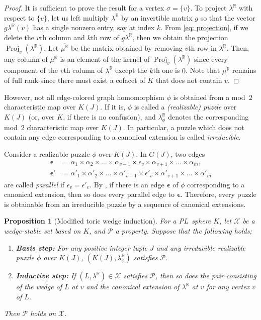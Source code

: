 \documentclass[11pt]{amsart}
\theoremstyle{plain}
\newtheorem{proposition}[theorem]{Proposition}
\numberwithin{equation}{section}
\theoremstyle{definition}
\newcommand{\R}{\mathbb{R}}
\newcommand{\cP}{\mathcal{P}}
\newcommand{\cX}{\mathcal{X}}
\DeclareMathOperator{\proj}{Proj}
\begin{document}
\begin{proof}
    It is sufficient to prove the result for a vertex $\sigma = \{v\}$.
    To project $\lambda^\R$ with respect to $\{v\}$, let us left multiply $\lambda^\R$ by an invertible matrix $g$ so that the vector $g\lambda^\R(v)$ has a single nonzero entry, say at index $k$.
    From \eqref{eq: projection}, if we delete the $v$th column and $k$th row of $g\lambda^\R$, then we obtain the projection $\proj_{v}(\lambda^\R)$.
    Let $\overline{\mu^\R}$ be the matrix obtained by removing $v$th row in $\overline{\lambda^\R}$.
    Then, any column of $\overline{\mu^\R}$ is an element of the kernel of $\proj_{v}(\lambda^\R)$ since every component of the $v$th column of $\lambda^\R$ except the $k$th one is $0$.
    Note that $\overline{\mu^\R}$ remains of full rank since there must exist a cofacet of $K$ that does not contain $v$.
\end{proof}

However, not all edge-colored graph homomorphism $\phi$ is obtained from a mod~$2$ characteristic map over $K(J)$.
If it is, $\phi$ is called a \emph{(realizable) puzzle} over $K(J)$ (or, over $K$, if there is no confusion), and $\lambda_\phi^\R$ denotes the corresponding mod~$2$ characteristic map over $K(J)$.
In particular, a puzzle which does not contain any edge corresponding to a canonical extension is called \emph{irreducible}.

Consider a realizable puzzle $\phi$ over $K(J)$.
In $G(J)$, two edges \begin{align*} \bm{\epsilon} &= \alpha_1 \times \alpha_2 \times \dots \times \alpha_{v-1} \times \epsilon_v \times \alpha_{v+1} \times \dots \times \alpha_m, \\
                                      \bm{\epsilon}' &= \alpha'_1 \times \alpha'_2 \times \dots \times \alpha'_{v-1} \times \epsilon'_v \times \alpha'_{v+1} \times \dots \times \alpha'_m  \end{align*}
are called \emph{parallel} if $\epsilon_v = \epsilon'_v$.
By \cite[Corollary~4.4]{CP_wedge_2}, if there is an edge $\bm{\epsilon}$ of $\phi$  corresponding to a canonical extension, then so does every parallel edge to $\bm{\epsilon}$.
Therefore, every puzzle is obtainable from an irreducible puzzle by a sequence of canonical extensions.


\begin{proposition}[Modified toric wedge induction] \label{MTWI}
    For a PL~sphere $K$, let $\cX$ be a wedge-stable set based on $K$, and $\cP$ a property.
    Suppose that the following holds;
    \begin{enumerate}
      \item \textbf{Basis step:} For any positive integer tuple $J$ and any irreducible realizable puzzle $\phi$ over $K(J)$, $(K(J),\lambda_\phi^\R)$ satisfies $\cP$.
      \item \textbf{Inductive step:} If $(L, \lambda^\R) \in \cX$ satisfies $\cP$, then so does the pair consisting of the wedge of $L$ at $v$ and the canonical extension of $\lambda^\R$ at $v$ for any vertex $v$ of $L$.
    \end{enumerate}
    Then $\cP$ holds on $\cX$.
\end{proposition}
\end{document}
